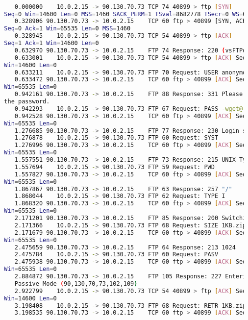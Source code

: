 \documentclass[a4paper]{report} %
\begin{document}
\begin{lstlisting}[language=bash]

     0.000000    10.0.2.15 -> 90.130.70.73 TCP 74 40899 > ftp [SYN]
  Seq=0 Win=14600 Len=0 MSS=1460 SACK_PERM=1 TSval=8682778 TSecr=0 WS=64
     0.328906 90.130.70.73 -> 10.0.2.15    TCP 60 ftp > 40899 [SYN, ACK]
  Seq=0 Ack=1 Win=65535 Len=0 MSS=1460
     0.328945    10.0.2.15 -> 90.130.70.73 TCP 54 40899 > ftp [ACK]
  Seq=1 Ack=1 Win=14600 Len=0
     0.632970 90.130.70.73 -> 10.0.2.15    FTP 74 Response: 220 (vsFTPd 2.3.5)
     0.633001    10.0.2.15 -> 90.130.70.73 TCP 54 40899 > ftp [ACK] Seq=1 Ack=21
  Win=14600 Len=0
     0.633211    10.0.2.15 -> 90.130.70.73 FTP 70 Request: USER anonymous
     0.633472 90.130.70.73 -> 10.0.2.15    TCP 60 ftp > 40899 [ACK] Seq=21 Ack=17
  Win=65535 Len=0
     0.942161 90.130.70.73 -> 10.0.2.15    FTP 88 Response: 331 Please specify
  the password.
     0.942293    10.0.2.15 -> 90.130.70.73 FTP 67 Request: PASS -wget@
     0.942528 90.130.70.73 -> 10.0.2.15    TCP 60 ftp > 40899 [ACK] Seq=55 Ack=30
  Win=65535 Len=0
     1.276685 90.130.70.73 -> 10.0.2.15    FTP 77 Response: 230 Login successful.
     1.276878    10.0.2.15 -> 90.130.70.73 FTP 60 Request: SYST
     1.276996 90.130.70.73 -> 10.0.2.15    TCP 60 ftp > 40899 [ACK] Seq=78 Ack=36
  Win=65535 Len=0
     1.557551 90.130.70.73 -> 10.0.2.15    FTP 73 Response: 215 UNIX Type: L8
     1.557694    10.0.2.15 -> 90.130.70.73 FTP 59 Request: PWD
     1.557827 90.130.70.73 -> 10.0.2.15    TCP 60 ftp > 40899 [ACK] Seq=97 Ack=41
  Win=65535 Len=0
     1.867867 90.130.70.73 -> 10.0.2.15    FTP 63 Response: 257 "/"
     1.868044    10.0.2.15 -> 90.130.70.73 FTP 62 Request: TYPE I
     1.868320 90.130.70.73 -> 10.0.2.15    TCP 60 ftp > 40899 [ACK] Seq=106 Ack=49
  Win=65535 Len=0
     2.171201 90.130.70.73 -> 10.0.2.15    FTP 85 Response: 200 Switching to Binary mode.
     2.171366    10.0.2.15 -> 90.130.70.73 FTP 68 Request: SIZE 1KB.zip
     2.171679 90.130.70.73 -> 10.0.2.15    TCP 60 ftp > 40899 [ACK] Seq=137 Ack=63
  Win=65535 Len=0
     2.475659 90.130.70.73 -> 10.0.2.15    FTP 64 Response: 213 1024
     2.475784    10.0.2.15 -> 90.130.70.73 FTP 60 Request: PASV
     2.475938 90.130.70.73 -> 10.0.2.15    TCP 60 ftp > 40899 [ACK] Seq=147 Ack=69
  Win=65535 Len=0
     2.884872 90.130.70.73 -> 10.0.2.15    FTP 105 Response: 227 Entering
     Passive Mode (90,130,70,73,102,109)
     2.922799    10.0.2.15 -> 90.130.70.73 TCP 54 40899 > ftp [ACK] Seq=69 Ack=197
  Win=14600 Len=0
     3.198408    10.0.2.15 -> 90.130.70.73 FTP 68 Request: RETR 1KB.zip
     3.198535 90.130.70.73 -> 10.0.2.15    TCP 60 ftp > 40899 [ACK] Seq=197 Ack=83

\end{lstlisting}
\end{document}

